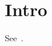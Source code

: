 \documentclass{article}
\begin{document}
\section{Intro}\label{sec:intro}
See~\cite{smith2024}.

\end{document}

